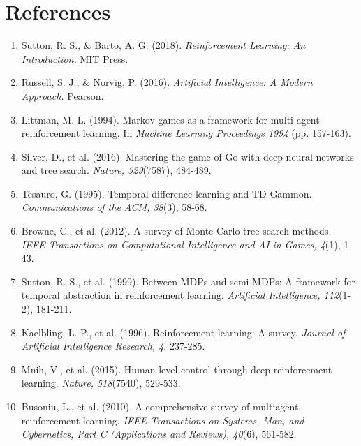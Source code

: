 \documentclass{article}
\begin{document}
\section{References}
\begin{enumerate}
    \item Sutton, R. S., \& Barto, A. G. (2018). \textit{Reinforcement Learning: An Introduction.} MIT Press.
    
    \item Russell, S. J., \& Norvig, P. (2016). \textit{Artificial Intelligence: A Modern Approach.} Pearson.
    
    \item Littman, M. L. (1994). Markov games as a framework for multi-agent reinforcement learning. In \textit{Machine Learning Proceedings 1994} (pp. 157-163).
    
    \item Silver, D., et al. (2016). Mastering the game of Go with deep neural networks and tree search. \textit{Nature, 529}(7587), 484-489.
    
    \item Tesauro, G. (1995). Temporal difference learning and TD-Gammon. \textit{Communications of the ACM, 38}(3), 58-68.
    
    \item Browne, C., et al. (2012). A survey of Monte Carlo tree search methods. \textit{IEEE Transactions on Computational Intelligence and AI in Games, 4}(1), 1-43.
    
    \item Sutton, R. S., et al. (1999). Between MDPs and semi-MDPs: A framework for temporal abstraction in reinforcement learning. \textit{Artificial Intelligence, 112}(1-2), 181-211.
    
    \item Kaelbling, L. P., et al. (1996). Reinforcement learning: A survey. \textit{Journal of Artificial Intelligence Research, 4}, 237-285.
    
    \item Mnih, V., et al. (2015). Human-level control through deep reinforcement learning. \textit{Nature, 518}(7540), 529-533.
    
    \item Busoniu, L., et al. (2010). A comprehensive survey of multiagent reinforcement learning. \textit{IEEE Transactions on Systems, Man, and Cybernetics, Part C (Applications and Reviews), 40}(6), 561-582.
    
\end{enumerate}
\end{document}
